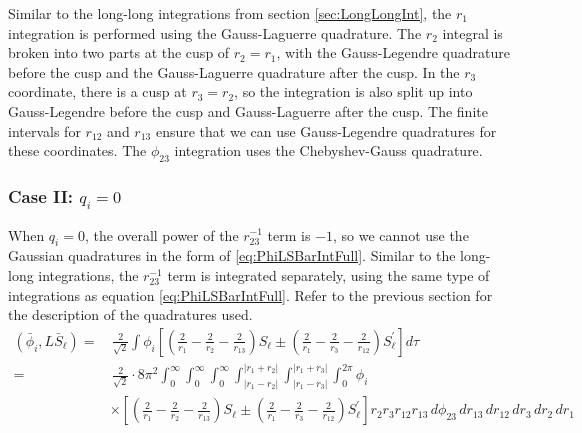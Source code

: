\documentclass[Dissertation.tex]{subfiles}
\begin{document}
Similar to the long-long integrations from section \ref{sec:LongLongInt}, the $r_1$ integration is performed using the Gauss-Laguerre quadrature.  The $r_2$ integral is broken into two parts at the cusp of $r_2 = r_1$, with the Gauss-Legendre quadrature before the cusp and the Gauss-Laguerre quadrature after the cusp.  In the $r_3$ coordinate, there is a cusp at $r_3 = r_2$, so the integration is also split up into Gauss-Legendre before the cusp and Gauss-Laguerre after the cusp.  The finite intervals for $r_{12}$ and $r_{13}$ ensure that we can use Gauss-Legendre quadratures for these coordinates.  The $\phi_{23}$ integration uses the Chebyshev-Gauss quadrature.

\subsubsection{Case II: \texorpdfstring{$q_i = 0$}{qi = 0}}
When $q_i = 0$, the overall power of the $r_{23}^{-1}$ term is $-1$, so we cannot use the Gaussian quadratures in the form of \ref{eq:PhiLSBarIntFull}.  Similar to the long-long integrations, the $r_{23}^{-1}$ term is integrated separately, using the same type of integrations as equation \ref{eq:PhiLSBarIntFull}.  Refer to the previous section for the description of the quadratures used.
\begin{align}
\label{eq:PhiLSBarIntNoR23}
\nonumber (\bar{\phi}_i, L\bar{S}_\ell) =& \,\frac{2}{\sqrt{2}} \int \phi_i \left[ \left( \frac{2}{r_1} - \frac{2}{r_2} - \frac{2}{r_{13}} \right)S_\ell \pm \left( \frac{2}{r_1} - \frac{2}{r_3} - \frac{2}{r_{12}} \right) S_\ell^\prime \right]  d\tau \\
\nonumber =&\, \frac{2}{\sqrt{2}} \cdot 8\pi^2  \int_0^\infty \int_0^\infty \int_0^\infty \int_{|r_1 - r_2|}^{|r_1 + r_2|} \int_{|r_1 - r_3|}^{|r_1 + r_3|} \int_0^{2\pi} \phi_i \\
&\times \left[ \left( \frac{2}{r_1} - \frac{2}{r_2} - \frac{2}{r_{13}} \right)S_\ell \pm \left( \frac{2}{r_1} - \frac{2}{r_3} - \frac{2}{r_{12}} \right) S_\ell^\prime \right]  r_2 r_3 r_{12} r_{13}\, d\phi_{23}\, dr_{13}\, dr_{12}\, dr_3\, dr_2\, dr_1
\end{align}
\end{document}
